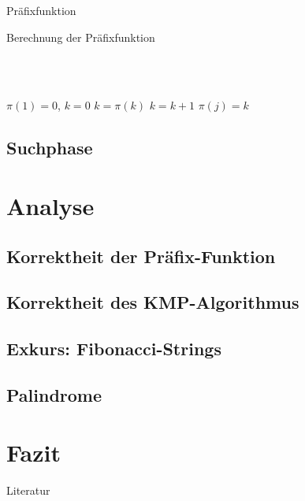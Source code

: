 \documentclass[xcolor=dvipsnames, aspectratio=169]{beamer}
\begin{document}
\begin{frame}{Präfixfunktion}
\begin{mybox}{Berechnung der Präfixfunktion \cites{cormenalgorithms2009}}
\begin{algorithmic}[lines]
\\\\

\centering
\parbox[l]{8cm}{
\State $\pi(1) = 0$, $k=0$
		\State $k=\pi(k)$
	\EndWhile
		\State $k=k+1$
	\EndIf
	\State $\pi(j)=k$
\EndFor

\Return{$\pi$}
}
\end{algorithmic}
\end{mybox}
\end{frame}

\subsection{Suchphase}

\section{Analyse}

\subsection{Korrektheit der Präfix-Funktion}
\subsection{Korrektheit des KMP-Algorithmus}
\subsection{Exkurs: Fibonacci-Strings}
\subsection{Palindrome}

\section{Fazit}

\begin{frame}{Literatur}
\nocite{*}
\printbibliography
\end{frame}

\end{document}
